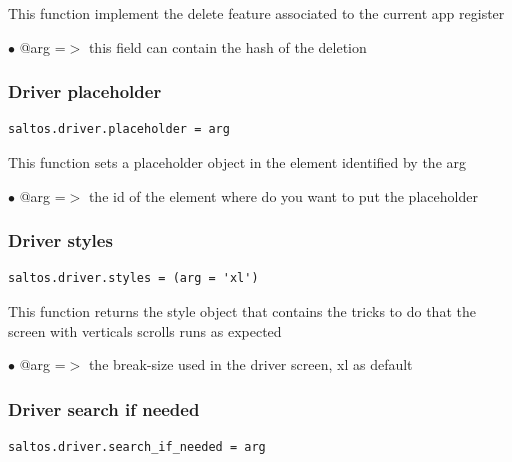 \documentclass[a4paper]{article}
\begin{document}
This function implement the delete feature associated to the current app register

\begin{compactitem}
\item[\color{myblue}$\bullet$] @arg =$>$ this field can contain the hash of the deletion
\end{compactitem}

\hypertarget{toc177}{}
\subsubsection{Driver placeholder}

\begin{lstlisting}
saltos.driver.placeholder = arg
\end{lstlisting}

This function sets a placeholder object in the element identified by the arg

\begin{compactitem}
\item[\color{myblue}$\bullet$] @arg =$>$ the id of the element where do you want to put the placeholder
\end{compactitem}

\hypertarget{toc178}{}
\subsubsection{Driver styles}

\begin{lstlisting}
saltos.driver.styles = (arg = 'xl')
\end{lstlisting}

This function returns the style object that contains the tricks to do
that the screen with verticals scrolls runs as expected

\begin{compactitem}
\item[\color{myblue}$\bullet$] @arg =$>$ the break-size used in the driver screen, xl as default
\end{compactitem}

\hypertarget{toc179}{}
\subsubsection{Driver search if needed}

\begin{lstlisting}
saltos.driver.search_if_needed = arg
\end{lstlisting}
\end{document}
